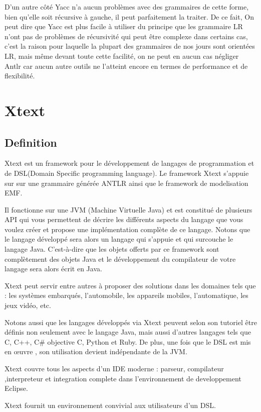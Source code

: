 \documentclass{article}
\begin{document}
D’un autre côté Yacc n’a aucun problèmes avec des grammaires de cette forme, bien qu’elle soit récursive à gauche, il peut parfaitement la traiter.
De ce fait, On peut dire que Yacc est plus facile à utiliser du principe que les grammaire LR n’ont pas de problèmes de récursivité qui peut être complexe dans certains cas, c’est la raison pour laquelle la plupart des grammaires de nos jours sont orientées LR, mais même devant toute cette facilité, on ne peut en aucun cas négliger Antlr car aucun autre outils ne l’atteint encore en termes de performance et de flexibilité.

\section{Xtext}
\subsection{Definition}
Xtext est un framework pour le développement de langages de programmation et de DSL(Domain Specific programming language).
Le framework Xtext s’appuie sur sur une grammaire générée ANTLR ainsi que le framework de modelisation EMF.

Il fonctionne sur une JVM (Machine Virtuelle Java) et est constitué de plusieurs API qui vous permettent de décrire les différents aspects du langage que vous voulez créer et propose une implémentation complète de ce langage. Notons que le langage développé sera alors un langage qui s'appuie et qui surcouche le langage Java. C'est-à-dire que les objets offerts par ce framework sont complètement des objets Java et le développement du compilateur de votre langage sera alors écrit en Java.

Xtext peut servir entre autres à proposer des solutions dans les domaines tels que : les systèmes embarqués, l'automobile, les appareils mobiles, l'automatique, les jeux vidéo, etc.

Notons aussi que les langages développés via Xtext peuvent selon son tutoriel être définis non seulement avec le langage Java, mais aussi d'autres langages tels que C, C++, C\# objective C, Python et Ruby. De plus, une fois que le DSL est mis en œuvre , son utilisation devient indépendante de la JVM. 

Xtext couvre tous les aspects d’un IDE moderne : parseur, compilateur ,interpreteur et integration complete dans l’environnement de developpement Eclipse.

Xtext fournit un environnement convivial aux utilisateurs d’un DSL.
\end{document}
